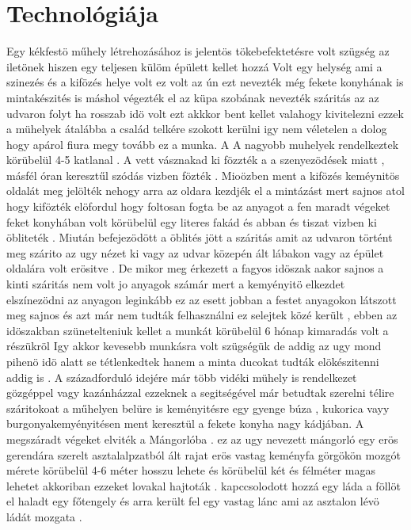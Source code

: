 \documentclass[fontsize=12pt, appendixprefix=true]{scrreprt}
\begin{document}
 





\section{Technológiája}
Egy kékfestö műhely létrehozásához is jelentös tökebefektetésre volt szügség az iletönek  hiszen egy teljesen külöm épülett kellet hozzá 
Volt egy helység ami a szinezés és a kifözés helye volt ez volt az ún ezt nevezték még fekete konyhának is 
mintakészités is máshol végezték el az küpa szobának nevezték 
száritás az az udvaron folyt ha rosszab idö volt ezt akkkor bent kellet valahogy kivitelezni 
 ezzek a mühelyek átalábba a család telkére szokott kerülni igy nem véletelen a dolog hogy apárol fiura megy tovább ez a munka.
 A A nagyobb muhelyek rendelkeztek körübelül 4-5 katlanal .
 A vett vásznakad ki fözzték a a szenyezödések miatt , másfél óran keresztűl szódás vizben fözték .
 Mioözben ment a kifözés  keméynitös oldalát meg jelölték nehogy arra az oldara kezdjék el a mintázást mert sajnos atol hogy kifözték elöfordul hogy foltosan fogta be az anyagot 
 a fen maradt végeket feket konyhában volt körübelül egy literes fakád és abban és tiszat vizben ki öbliteték .
 Miután befejezödött a öblités jött a száritás amit az udvaron történt meg szárito az ugy nézet ki vagy az udvar közepén ált lábakon  vagy az épület oldalára volt erösitve . De mikor meg érkezett a fagyos idöszak aakor sajnos a kinti száritás nem volt jo anyagok számár mert a kemyényitö elkezdet elszínezödni az anyagon  leginkább ez az esett jobban a festet anyagokon látszott meg sajnos és azt már nem tudták felhasználni ez selejtek közé került , ebben az idöszakban szünetelteniuk kellet a munkát körübelül 6 hónap kimaradás volt a részükröl
Igy akkor kevesebb munkásra volt szügségük de addig az ugy mond pihenö idö alatt se tétlenkedtek hanem a minta ducokat tudták elökészitenni addig is .
 A századforduló idejére már több vidéki mühely is rendelkezet gözgéppel vagy kazánházzal ezzeknek a segitségével már betudtak szerelni télire száritokoat a műhelyen belüre is
 keményitésre egy gyenge búza , kukorica  vayy burgonyakemyényitésen ment keresztül a fekete konyha nagy kádjában.
 A megszáradt végeket elviték a Mángorlóba . ez az ugy nevezett mángorló egy erös gerendára szerelt asztalalpzatból ált rajat erös vastag keményfa görgökön mozgót mérete körübelül 4-6 méter hosszu lehete és körübelül két és félméter magas lehetet
 akkoriban ezzeket lovakal hajtoták .
 kapccsolodott hozzá egy láda a föllöt el haladt egy főtengely és arra került fel egy vastag lánc ami az asztalon lévö ládát mozgata .
\end{document}
